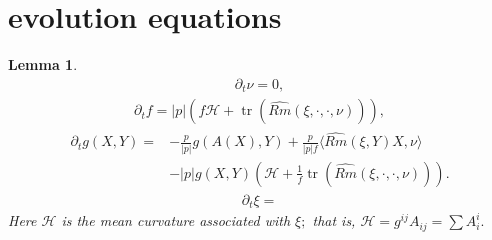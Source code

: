 \documentclass{amsart}
\newtheorem{lemma}[theorem]{Lemma}
\theoremstyle{definition}
\theoremstyle{remark}
\numberwithin{equation}{section}
\begin{document}
\section{evolution equations}

\begin{lemma}
\begin{align}
\partial_t\nu=0,
\end{align}
\begin{align}
\partial_t f = |p|(f\mathcal{H}+\operatorname{tr} (\widehat{Rm}(\xi,\cdot,\cdot,\nu))),
\end{align}
\begin{align}
\partial_tg(X,Y)=&-\frac{p}{|p|}g(A(X),Y)+\frac{p}{|p|f}\langle \widehat{Rm}(\xi,Y)X,\nu\rangle\\
&-
|p|g(X,Y)(\mathcal{H}+\frac{1}{f}\operatorname{tr} (\widehat{Rm}(\xi,\cdot,\cdot,\nu))).\nonumber
\end{align}
\begin{align}
\partial_t\xi=%
\end{align}
Here $\mathcal{H}$ is the mean curvature associated with $\xi;$ that is, $\mathcal{H}=g^{ij} A _{ij}=\sum  A _i^i.$
\end{lemma}
\end{document}
